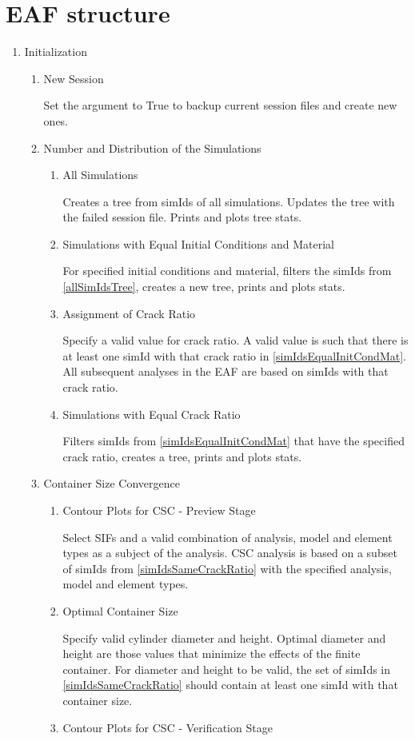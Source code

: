 \documentclass[10pt,a4paper]{article}
\begin{document}
\section{EAF structure}
\begin{enumerate}
\item Initialization
\begin{enumerate}
\item New Session

Set the argument to True to backup current session files and create new ones.
\item Number and Distribution of the Simulations
\begin{enumerate}
\item All Simulations\label{allSimIdsTree}

Creates a tree from simIds of all simulations. Updates the tree with the failed session file. Prints and plots tree stats.
\item Simulations with Equal Initial Conditions and Material\label{simIdsEqualInitCondMat}

For specified initial conditions and material, filters the simIds from \ref{allSimIdsTree}, creates a new tree, prints and plots stats.
\item Assignment of Crack Ratio

Specify a valid value for crack ratio. A valid value is such that there is at least one simId with that crack ratio in \ref{simIdsEqualInitCondMat}. All subsequent analyses in the EAF are based on simIds with that crack ratio.
\item Simulations with Equal Crack Ratio\label{simIdsSameCrackRatio}

Filters simIds from \ref{simIdsEqualInitCondMat} that have the specified crack ratio, creates a tree, prints and plots stats.
\end{enumerate}
\item Container Size Convergence
\begin{enumerate}
\item Contour Plots for CSC - Preview Stage

Select SIFs and a valid combination of analysis, model and element types as a subject of the analysis. CSC analysis is based on a subset of simIds from \ref{simIdsSameCrackRatio} with the specified analysis, model and element types.
\item Optimal Container Size\label{contSize}

Specify valid cylinder diameter and height. Optimal diameter and height are those values that minimize the effects of the finite container. For diameter and height to be valid, the set of simIds in \ref{simIdsSameCrackRatio} should contain at least one simId with that container size.
\item Contour Plots for CSC - Verification Stage


\end{enumerate}
\end{enumerate}
\end{enumerate}
\end{document}
